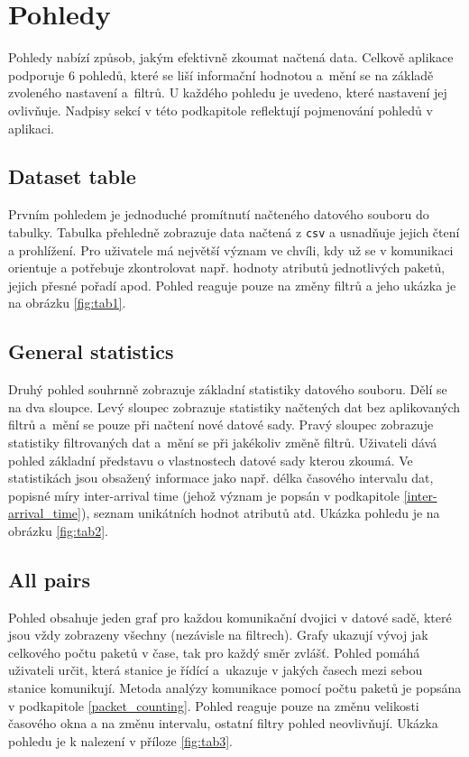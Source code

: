 \section{Pohledy}
\label{tab_views}


Pohledy nabízí způsob, jakým efektivně zkoumat načtená data. Celkově aplikace podporuje 6 pohledů, které se liší informační hodnotou a~mění se na základě zvoleného nastavení a~filtrů. U každého pohledu je uvedeno, které nastavení jej ovlivňuje. Nadpisy sekcí v této podkapitole reflektují pojmenování pohledů v aplikaci.


\subsection*{Dataset table}

Prvním pohledem je jednoduché promítnutí načteného datového souboru do tabulky. Tabulka přehledně zobrazuje data načtená z \texttt{csv} a usnadňuje jejich čtení a prohlížení. Pro uživatele má největší význam ve chvíli, kdy už se v komunikaci orientuje a potřebuje zkontrolovat např. hodnoty atributů jednotlivých paketů, jejich přesné pořadí apod. Pohled reaguje pouze na změny filtrů a jeho ukázka je na obrázku \ref{fig:tab1}.

\subsection*{General statistics}

Druhý pohled souhrnně zobrazuje základní statistiky datového souboru. Dělí se na dva sloupce. Levý sloupec zobrazuje statistiky načtených dat bez aplikovaných filtrů a~mění se pouze při načtení nové datové sady. Pravý sloupec zobrazuje statistiky filtrovaných dat a~mění se při jakékoliv změně filtrů. Uživateli dává pohled základní představu o vlastnostech datové sady kterou zkoumá. Ve statistikách jsou obsažený informace jako např. délka časového intervalu dat, popisné míry inter-arrival time (jehož význam je popsán v podkapitole \ref{inter-arrival_time}), seznam unikátních hodnot atributů atd. Ukázka pohledu je na obrázku \ref{fig:tab2}.

\subsection*{All pairs}
Pohled obsahuje jeden graf pro každou komunikační dvojici v datové sadě, které jsou vždy zobrazeny všechny (nezávisle na filtrech). Grafy ukazují vývoj jak celkového počtu paketů v čase, tak pro každý směr zvlášť. Pohled pomáhá uživateli určit, která stanice je řídící a~ukazuje v jakých časech mezi sebou stanice komunikují. Metoda analýzy komunikace pomocí počtu paketů je popsána v podkapitole \ref{packet_counting}. Pohled reaguje pouze na změnu velikosti časového okna a na změnu intervalu, ostatní filtry pohled neovlivňují. Ukázka pohledu je k nalezení v příloze \ref{fig:tab3}.


